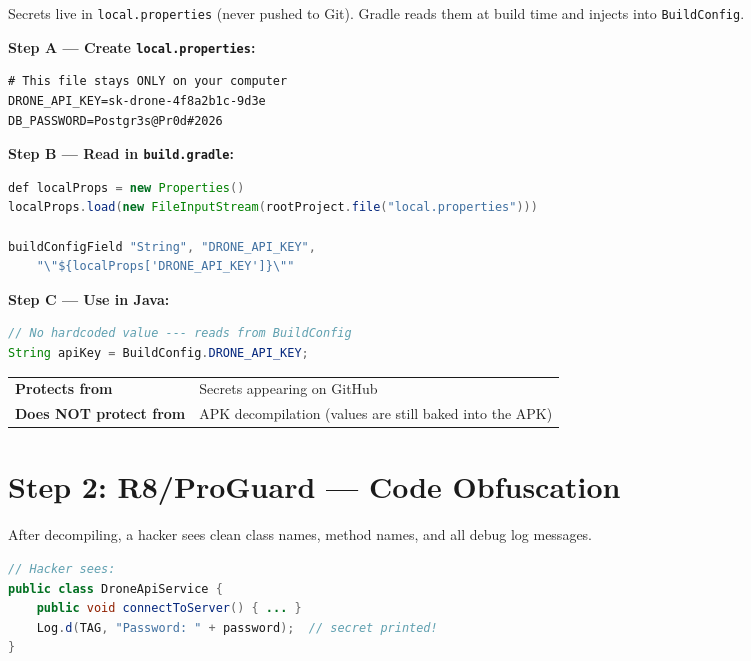 \documentclass[11pt,a4paper]{article}
\newcommand{\danger}[1]{\textcolor{danger}{\textbf{#1}}}
\newcommand{\safe}[1]{\textcolor{success}{\textbf{#1}}}
\begin{document}
\begin{solutionbox}
Secrets live in \texttt{local.properties} (never pushed to Git). Gradle reads them at build time and injects into \texttt{BuildConfig}.

\textbf{Step A --- Create \texttt{local.properties}:}
\begin{lstlisting}
# This file stays ONLY on your computer
DRONE_API_KEY=sk-drone-4f8a2b1c-9d3e
DB_PASSWORD=Postgr3s@Pr0d#2026
\end{lstlisting}

\textbf{Step B --- Read in \texttt{build.gradle}:}
\begin{lstlisting}[language=Java]
def localProps = new Properties()
localProps.load(new FileInputStream(rootProject.file("local.properties")))

buildConfigField "String", "DRONE_API_KEY",
    "\"${localProps['DRONE_API_KEY']}\""
\end{lstlisting}

\textbf{Step C --- Use in Java:}
\begin{lstlisting}[language=Java]
// No hardcoded value --- reads from BuildConfig
String apiKey = BuildConfig.DRONE_API_KEY;
\end{lstlisting}
\end{solutionbox}

\begin{notebox}
\begin{tabularx}{\textwidth}{lX}
\toprule
\safe{Protects from} & Secrets appearing on GitHub \\
\danger{Does NOT protect from} & APK decompilation (values are still baked into the APK) \\
\bottomrule
\end{tabularx}
\end{notebox}

\section{Step 2: R8/ProGuard --- Code Obfuscation}

\begin{problembox}
After decompiling, a hacker sees clean class names, method names, and all debug log messages.
\begin{lstlisting}[language=Java]
// Hacker sees:
public class DroneApiService {
    public void connectToServer() { ... }
    Log.d(TAG, "Password: " + password);  // secret printed!
}
\end{lstlisting}
\end{problembox}
\end{document}
